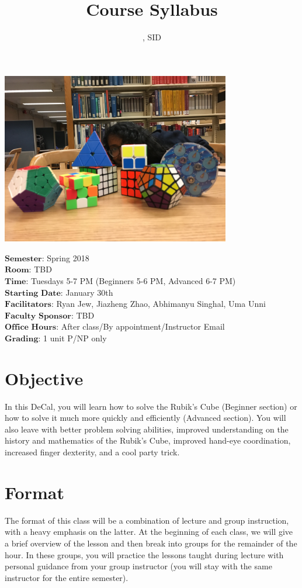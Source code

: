 \documentclass[11pt]{article}
\author{\Name, SID \SID}
\date{}
\begin{document}
\maketitle
\title{Course Syllabus}
\centerline{\includegraphics[width=10cm]{5.JPG}}

$\textbf{Semester}$: Spring 2018\\
$\textbf{Room}$: TBD\\
$\textbf{Time}$: Tuesdays 5-7 PM (Beginners 5-6 PM, Advanced 6-7 PM)\\
$\textbf{Starting Date}$: January 30th\\
$\textbf{Facilitators}$: Ryan Jew, Jiazheng Zhao, Abhimanyu Singhal, Uma Unni\\
$\textbf{Faculty Sponsor}$: TBD\\
$\textbf{Office Hours}$: After class/By appointment/Instructor Email \\
$\textbf{Grading}$: 1 unit P/NP only

\section*{Objective}
In this DeCal, you will learn how to solve the Rubik’s Cube (Beginner section) or how to solve it much more quickly and efficiently (Advanced section). You will also leave with better problem solving abilities, improved understanding on the history and mathematics of the Rubik’s Cube, improved hand-eye coordination, increased finger dexterity, and a cool party trick.


\section*{Format}
The format of this class will be a combination of lecture and group instruction, with a heavy emphasis on the latter. At the beginning of each class, we will give a brief overview of the lesson and then break into groups for the remainder of the hour. In these groups, you will practice the lessons taught during lecture with personal guidance from your group instructor (you will stay with the same instructor for the entire semester).
\end{document}
